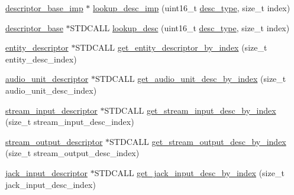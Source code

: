 \begin{DoxyCompactItemize}
\item 
\hyperlink{classavdecc__lib_1_1descriptor__base__imp}{descriptor\+\_\+base\+\_\+imp} $\ast$ \hyperlink{classavdecc__lib_1_1configuration__descriptor__imp_a143a190b7cebbb7ef3287569ec2d8c46}{lookup\+\_\+desc\+\_\+imp} (uint16\+\_\+t \hyperlink{classavdecc__lib_1_1descriptor__base__imp_a9dada313309522d04f1e52fe887442b4}{desc\+\_\+type}, size\+\_\+t index)
\item 
\hyperlink{classavdecc__lib_1_1descriptor__base}{descriptor\+\_\+base} $\ast$S\+T\+D\+C\+A\+LL \hyperlink{classavdecc__lib_1_1configuration__descriptor__imp_a265e068ed32f7c3694417ffe2c382309}{lookup\+\_\+desc} (uint16\+\_\+t \hyperlink{classavdecc__lib_1_1descriptor__base__imp_a9dada313309522d04f1e52fe887442b4}{desc\+\_\+type}, size\+\_\+t index)
\item 
\hyperlink{classavdecc__lib_1_1entity__descriptor}{entity\+\_\+descriptor} $\ast$S\+T\+D\+C\+A\+LL \hyperlink{classavdecc__lib_1_1configuration__descriptor__imp_a867b3334f9ced79397e48a920ce1c4a0}{get\+\_\+entity\+\_\+descriptor\+\_\+by\+\_\+index} (size\+\_\+t entity\+\_\+desc\+\_\+index)
\item 
\hyperlink{classavdecc__lib_1_1audio__unit__descriptor}{audio\+\_\+unit\+\_\+descriptor} $\ast$S\+T\+D\+C\+A\+LL \hyperlink{classavdecc__lib_1_1configuration__descriptor__imp_acdc4f7f785e8b0273e2c5865d7b0bfee}{get\+\_\+audio\+\_\+unit\+\_\+desc\+\_\+by\+\_\+index} (size\+\_\+t audio\+\_\+unit\+\_\+desc\+\_\+index)
\item 
\hyperlink{classavdecc__lib_1_1stream__input__descriptor}{stream\+\_\+input\+\_\+descriptor} $\ast$S\+T\+D\+C\+A\+LL \hyperlink{classavdecc__lib_1_1configuration__descriptor__imp_a631276fa2c5a4d98290df4fac94885e7}{get\+\_\+stream\+\_\+input\+\_\+desc\+\_\+by\+\_\+index} (size\+\_\+t stream\+\_\+input\+\_\+desc\+\_\+index)
\item 
\hyperlink{classavdecc__lib_1_1stream__output__descriptor}{stream\+\_\+output\+\_\+descriptor} $\ast$S\+T\+D\+C\+A\+LL \hyperlink{classavdecc__lib_1_1configuration__descriptor__imp_a3a72ee92a9eb884f3b71077e48a44b6d}{get\+\_\+stream\+\_\+output\+\_\+desc\+\_\+by\+\_\+index} (size\+\_\+t stream\+\_\+output\+\_\+desc\+\_\+index)
\item 
\hyperlink{classavdecc__lib_1_1jack__input__descriptor}{jack\+\_\+input\+\_\+descriptor} $\ast$S\+T\+D\+C\+A\+LL \hyperlink{classavdecc__lib_1_1configuration__descriptor__imp_a292deb3d387952c1675d786e9d5cbcc4}{get\+\_\+jack\+\_\+input\+\_\+desc\+\_\+by\+\_\+index} (size\+\_\+t jack\+\_\+input\+\_\+desc\+\_\+index)

\end{DoxyCompactItemize}

